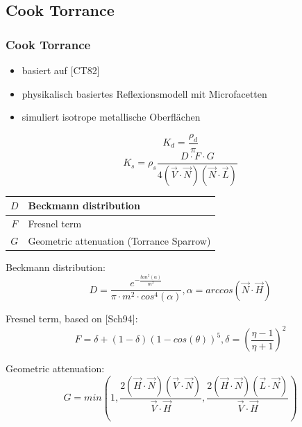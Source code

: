 \documentclass[11pt]{beamer}
\begin{document}
\subsection{Cook Torrance}
\begin{frame}[allowframebreaks]
\frametitle{Cook Torrance}

\begin{itemize}
\item basiert auf [CT82]
\item physikalisch basiertes Reflexionsmodell mit Microfacetten
\item simuliert isotrope metallische Oberflächen
\end{itemize}

\begin{equation}
K_d = \frac{\rho_d}{\pi}
\end{equation}
\begin{equation}
K_s =\rho_s \frac{D \cdot F \cdot G}{4(\vec{V} \cdot \vec{N})(\vec{N} \cdot \vec{L})}
\end{equation}

\begin{table}[H]
\begin{tabular}{| c | l |}
\hline
$D$ & Beckmann distribution\\ \hline
$F$ & Fresnel term\\ \hline
$G$ & Geometric attenuation (Torrance Sparrow)\\ \hline
\end{tabular}
\end{table}

\framebreak

Beckmann distribution:
\begin{equation}
D = \frac{e^{-\frac{tan^2(\alpha)}{m^2}}}{\pi \cdot m^2 \cdot cos^4(\alpha)}\label{eq:beckmann} , \alpha = arccos(\vec{N} \cdot \vec{H})
\end{equation}

Fresnel term, based on [Sch94]:
\begin{equation}
F = \delta + (1-\delta)(1-cos(\theta))^5 , \delta = \left(\frac{\eta - 1}{\eta+1}\right)^2
\end{equation}

Geometric attenuation:
\begin{equation}
G = min \left(1,\frac{2(\vec{H} \cdot \vec{N})(\vec{V} \cdot \vec{N})}{\vec{V} \cdot \vec{H}},\frac{2 (\vec{H} \cdot \vec{N})(\vec{L} \cdot \vec{N})}{\vec{V} \cdot \vec{H}}\right)
\end{equation}



\end{frame}
\end{document}
